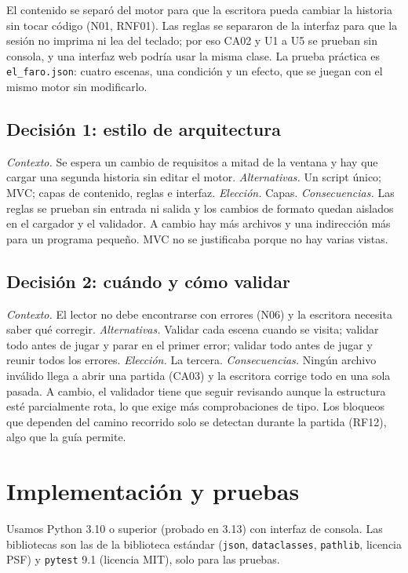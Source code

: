 \documentclass[11pt,letterpaper]{article}
\newcommand{\cod}[1]{\texttt{#1}}
\begin{document}
El contenido se separó del motor para que la escritora pueda cambiar la historia sin tocar código (N01, RNF01). Las reglas se separaron de la interfaz para que la sesión no imprima ni lea del teclado; por eso CA02 y U1 a U5 se prueban sin consola, y una interfaz web podría usar la misma clase. La prueba práctica es \cod{el\_faro.json}: cuatro escenas, una condición y un efecto, que se juegan con el mismo motor sin modificarlo.

\subsection{Decisión 1: estilo de arquitectura}
\textit{Contexto.} Se espera un cambio de requisitos a mitad de la ventana y hay que cargar una segunda historia sin editar el motor.
\textit{Alternativas.} Un script único; MVC; capas de contenido, reglas e interfaz.
\textit{Elección.} Capas.
\textit{Consecuencias.} Las reglas se prueban sin entrada ni salida y los cambios de formato quedan aislados en el cargador y el validador. A cambio hay más archivos y una indirección más para un programa pequeño. MVC no se justificaba porque no hay varias vistas.

\subsection{Decisión 2: cuándo y cómo validar}
\textit{Contexto.} El lector no debe encontrarse con errores (N06) y la escritora necesita saber qué corregir.
\textit{Alternativas.} Validar cada escena cuando se visita; validar todo antes de jugar y parar en el primer error; validar todo antes de jugar y reunir todos los errores.
\textit{Elección.} La tercera.
\textit{Consecuencias.} Ningún archivo inválido llega a abrir una partida (CA03) y la escritora corrige todo en una sola pasada. A cambio, el validador tiene que seguir revisando aunque la estructura esté parcialmente rota, lo que exige más comprobaciones de tipo. Los bloqueos que dependen del camino recorrido solo se detectan durante la partida (RF12), algo que la guía permite.

\section{Implementación y pruebas}
Usamos Python 3.10 o superior (probado en 3.13) con interfaz de consola. Las bibliotecas son las de la biblioteca estándar (\cod{json}, \cod{dataclasses}, \cod{pathlib}, licencia PSF) y \cod{pytest} 9.1 (licencia MIT), solo para las pruebas.
\end{document}
